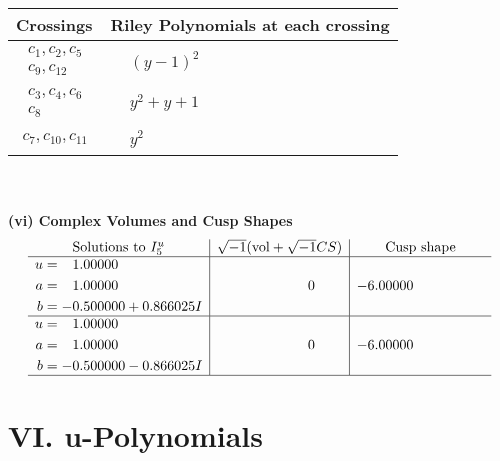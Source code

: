 \documentclass[1p]{elsarticle_modified}
\theoremstyle{definition}
\newcommand{\I}{\sqrt{-1}}
\begin{document}
\begin{tabular}{m{50pt}|m{274pt}}
Crossings & \hspace{64pt}Riley Polynomials at each crossing \\
\hline $$\begin{aligned}c_{1},c_{2},c_{5}\\c_{9},c_{12}\end{aligned}$$&$\begin{aligned}
&(y-1)^2
\end{aligned}$\\
\hline $$\begin{aligned}c_{3},c_{4},c_{6}\\c_{8}\end{aligned}$$&$\begin{aligned}
&y^2+y+1
\end{aligned}$\\
\hline $$\begin{aligned}c_{7},c_{10},c_{11}\end{aligned}$$&$\begin{aligned}
&y^2
\end{aligned}$\\
\hline
\end{tabular}\\~\\
\newpage\flushleft \textbf{(vi) Complex Volumes and Cusp Shapes}
$$\begin{array}{c|c|c}  
\text{Solutions to }I^u_{5}& \I (\text{vol} + \sqrt{-1}CS) & \text{Cusp shape}\\
 \hline 
\begin{aligned}
u &= \phantom{-}1.00000\phantom{ +0.000000I} \\
a &= \phantom{-}1.00000\phantom{ +0.000000I} \\
b &= -0.500000 + 0.866025 I\end{aligned}
 & \phantom{-0.000000 } 0 & -6.00000\phantom{ +0.000000I} \\ \hline\begin{aligned}
u &= \phantom{-}1.00000\phantom{ +0.000000I} \\
a &= \phantom{-}1.00000\phantom{ +0.000000I} \\
b &= -0.500000 - 0.866025 I\end{aligned}
 & \phantom{-0.000000 } 0 & -6.00000\phantom{ +0.000000I}\\
 \hline 
 \end{array}$$\newpage
\newpage\renewcommand{\arraystretch}{1}
\centering \section*{ VI. u-Polynomials}
\end{document}
